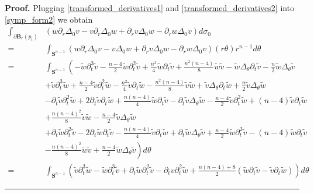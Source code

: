 \documentclass[10pt,a4paper]{amsart}
\newcommand{\B}{\mathbf{B}}
\newcommand{\Ss}{\mathbf{S}}
\newenvironment{proof}[1][Proof]{\noindent\textbf{#1.} }{\hfill\rule{0.5em}{0.5em}}
\begin{document}
\begin{proof}
 Plugging \eqref{transformed_derivatives1} and \eqref{transformed_derivatives2}
 into \eqref{symp_form2} we obtain 
 \begin{align*}
   \int_{\partial \B_r(p_i)} & \left(w \partial_r \Delta_0 v - v \partial_r \Delta_0 w + 
 \partial_r v \Delta_0 w - \partial_r w \Delta_0 v\right) d\sigma_0\\  
 = & \int_{\Ss^{n-1}} (w \partial_r \Delta_0 v - v \Delta_0 w + \partial_r v \Delta_0 w - \partial_r w  \Delta_0 v )(r\theta)r^{n-1} d\theta\\
 = &\int_{\Ss^{n-1}} \left ( -\widetilde{w}\partial_t^3 \widetilde{v} - \frac{n-4}{2}  \widetilde{w}
 \partial_t^2 \widetilde{v} + \frac{n^2}{4} \widetilde{w}\partial_t \widetilde{v} + \frac{n^2(n-4)}{8} \widetilde{w}\widetilde{v} 
 - \widetilde{w}\Delta_\theta \partial_t \widetilde{v} - \frac{n}{2} \widetilde{w}\Delta_\theta \widetilde{v}  \right.\\
 & +\widetilde{v}\partial_t^3 \widetilde{w} + \frac{n-4}{2}  \widetilde{v}
 \partial_t^2 \widetilde{w} - \frac{n^2}{4} \widetilde{v}\partial_t \widetilde{w} - \frac{n^2(n-4)}{8} \widetilde{v}\widetilde{w} 
 + \widetilde{v}\Delta_\theta \partial_t \widetilde{w} + \frac{n}{2} \widetilde{v}\Delta_\theta \widetilde{w} \\ 
 &-\partial_t \widetilde{v} \partial_t^2 \widetilde{w} + 2 \partial_t \widetilde{v} 
 \partial_t \widetilde{w} + \frac{n(n-4)}{4} \widetilde{w} \partial_t \widetilde{v} - \partial_t \widetilde{v} 
 \Delta_\theta \widetilde{w}  - \frac{n-4}{2} \widetilde{v} \partial_t^2\widetilde{w} + (n-4)\widetilde{v} 
 \partial_t\widetilde{w}\\
 &+ \frac{n(n-4)^2}{8} \widetilde{v}\widetilde{w} - \frac{n-4}{2} \widetilde{v} \Delta_\theta
 \widetilde{w}\\ 
 &+\partial_t \widetilde{w} \partial_t^2 \widetilde{v} - 2 \partial_t \widetilde{w} 
 \partial_t \widetilde{v} - \frac{n(n-4)}{4} \widetilde{v} \partial_t \widetilde{w} + \partial_t \widetilde{w} 
 \Delta_\theta \widetilde{v}  + \frac{n-4}{2} \widetilde{w} \partial_t^2\widetilde{v} - (n-4)\widetilde{w} 
 \partial_t\widetilde{v}\\
 &\left.- \frac{n(n-4)^2}{8} \widetilde{w}\widetilde{v} + \frac{n-4}{2} \widetilde{w} \Delta_\theta
 \widetilde{v} \right)d\theta\\
 = & \int_{\Ss^{n-1}} \left ( \widetilde{v} \partial_t^3 \widetilde{w} - \widetilde{w} \partial_t^3 \widetilde{v} 
 + \partial_t\widetilde{w} \partial_t^2 \widetilde{v} - \partial_t{v} \partial_t^2\widetilde{w} 
 +\frac{n(n-4)+8}{2} (\widetilde{w}\partial_t \widetilde{v} - \widetilde{v} \partial_t\widetilde{w} 
 )\right ) d\theta
 \end{align*}



\end{proof}
\end{document}

